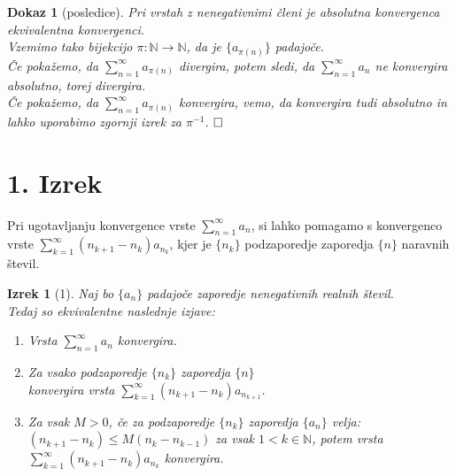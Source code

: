 \documentclass{beamer}
\def\qed{$\hfill\Box$}   %
\newtheorem{izrek}{Izrek}
\newtheorem{dokaz}{Dokaz}
\def\N{\mathbb{N}} %
\begin{document}
\begin{frame}
    \begin{dokaz}[posledice]
        Pri vrstah z nenegativnimi členi je absolutna konvergenca ekvivalentna konvergenci.\\
        \pause
        Vzemimo tako bijekcijo $\pi: \N \rightarrow \N$, da je $\{a_{\pi(n)}\}$ padajoče.\\
        \pause
        Če pokažemo, da $\sum_{n = 1}^{\infty}{a_{\pi(n)}}$ divergira, potem sledi, da $\sum_{n = 1}^{\infty}{a_n}$ ne konvergira absolutno, torej divergira.\\
        \pause
        Če pokažemo, da $\sum_{n = 1}^{\infty}{a_{\pi(n)}}$ konvergira, vemo, da konvergira tudi absolutno in lahko uporabimo zgornji izrek za $\pi^{-1}$.
        \qed
    \end{dokaz}
    
\end{frame}

\section{1. Izrek}

\begin{frame}
    Pri ugotavljanju konvergence vrste $\sum_{n = 1}^{\infty}{a_n}$, si lahko pomagamo s konvergenco vrste
    $\sum_{k = 1}^{\infty}{(n_{k+1} - n_k)a_{n_{k}}}$, kjer je $\{n_k\}$ podzaporedje zaporedja $\{n\}$ naravnih števil.    
\end{frame}

\begin{frame}
    \begin{izrek}[1]
        Naj bo $\{a_n\}$ padajoče zaporedje nenegativnih realnih števil. \\
        
        Tedaj so ekvivalentne naslednje izjave:
        \pause
        \begin{enumerate}
            \item Vrsta $\sum_{n = 1}^{\infty}{a_n}$ konvergira.
            \pause
            \item Za vsako podzaporedje $\{n_k\}$ zaporedja $\{n\}$ \\
            konvergira vrsta $\sum_{k = 1}^{\infty}{(n_{k+1} - n_k)a_{n_{k + 1}}}$.
            \pause
            \item Za vsak $M > 0$, če za podzaporedje $\{n_k\}$ zaporedja $\{a_n\}$ velja:\\
            $ (n_{k+1} - n_k) \leq M(n_k - n_{k - 1})$ za vsak $ 1 < k \in \N$,
            potem vrsta $\sum_{k = 1}^{\infty}{(n_{k+1} - n_k)a_{n_{k}}}$ konvergira.
        \end{enumerate}
    \end{izrek}
\end{frame}
\end{document}
